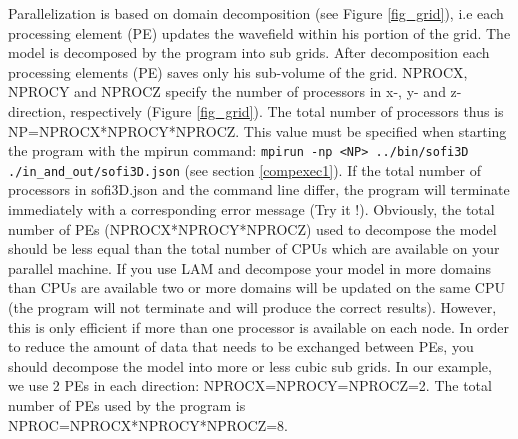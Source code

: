 \documentclass[11pt,onecolumn,oneside]{article}
\begin{document}
Parallelization is based on domain decomposition (see Figure \ref{fig_grid}), i.e each processing element (PE) updates the wavefield within his portion of the grid. The model is  decomposed
by the program into sub grids. After decomposition each processing elements (PE) saves only his sub-volume of the grid. NPROCX, NPROCY and NPROCZ specify the number of
processors in x-, y- and z-direction, respectively (Figure  \ref{fig_grid}). The total number of processors thus is NP=NPROCX*NPROCY*NPROCZ. This value must be specified when starting the program with the mpirun command:  \lstinline{mpirun -np <NP> ../bin/sofi3D ./in_and_out/sofi3D.json} (see section \ref{compexec1}). If the total number of processors in sofi3D.json
and the command line differ, the program will terminate immediately with a corresponding error message (Try it !). Obviously, the total number of PEs (NPROCX*NPROCY*NPROCZ) used to decompose the model  should be less equal than the total number of CPUs which are available on your parallel machine. If you use LAM and decompose your model in more domains than CPUs are available two or more  domains will be updated on the same CPU (the program will not terminate and will produce the correct results). However, this is only efficient if more than one processor is available on each node. In order to reduce the amount of data that needs to be  exchanged between PEs, you should decompose the model into more or less cubic sub grids. In our example, we use 2 PEs in each direction: NPROCX=NPROCY=NPROCZ=2. The total number of PEs used by the program is NPROC=NPROCX*NPROCY*NPROCZ=8. 
\end{document}
